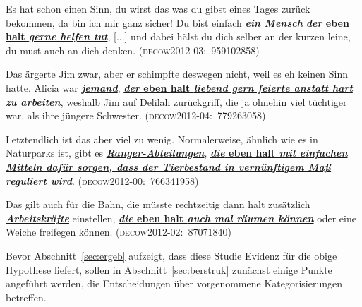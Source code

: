 \begin{exe}
	\ex\label{750} 
		\begin{xlist}	
		\ex\label{750a} 
	
		Es hat schon einen Sinn, du wirst das was du gibst eines Tages zurück bekommen, da bin ich
	 	mir ganz sicher! Du bist einfach \ul{\textbf{\textit{ein Mensch}}} \ul{\textbf{\textit{der} eben halt \textit{gerne helfen tut}}}, [...] und dabei hälst du dich selber an der kurzen leine, du must auch an dich denken.	
	 	\newline\hbox{}\hfill\hbox{\scshape(decow2012-03: 959102858)}
	 	\newline
	 	\hbox{}\hfill\hbox{\citet[168]{Mueller2016a}}
	 	\ex\label{750b} 
	 
	 	Das ärgerte Jim zwar, aber er schimpfte deswegen nicht, weil es eh keinen Sinn hatte. Alicia war \ul{\textit{\textbf{jemand}}}, \ul{\textbf{\textit{der} eben halt \textit{liebend gern feierte anstatt hart zu arbeiten}}}, weshalb Jim auf Delilah zurückgriff, die ja ohnehin viel tüchtiger war, als ihre jüngere Schwester.
		\newline		
	 	\hbox{}\hfill\hbox{\scshape(decow2012-04: 779263058)}
		\end{xlist}
\end{exe}

\begin{exe}
	\ex\label{751} 
		\begin{xlist}	
		\ex\label{751a} 
	
		Letztendlich ist das aber viel zu wenig. Normalerweise, ähnlich wie es in Naturparks ist, gibt es \ul{\textbf{\textit{Ranger-Abteilungen}}}, \ul{\textbf{\textit{die} eben halt \textit{mit einfachen Mitteln dafür sorgen, dass der Tierbestand in vernünftigem Maß reguliert wird}}}. 
	 	\hfill\hbox{\scshape(decow2012-00: 766341958)}
	 	\newline
	 	\hbox{}\hfill\hbox{\citet[168]{Mueller2016a}}
	 	\ex\label{751b} 
	 
	 	Das gilt auch für die Bahn, die müsste rechtzeitig dann halt zusätzlich \ul{\textbf{\textit{Arbeitskräfte}}} einstellen, \ul{\textbf{\textit{die} eben halt \textit{auch mal räumen können}}} oder eine Weiche freifegen können.
	 	\hbox{}\hfill\hbox{\scshape(decow2012-02: 87071840)}
		\end{xlist}
\end{exe} 
Bevor Abschnitt~\ref{sec:ergeb} aufzeigt, dass diese Studie Evidenz für die obige Hypothese liefert, sollen in Abschnitt~\ref{sec:berstruk} zunächst einige Punkte angeführt werden, die Entscheidungen über vorgenommene Kategorisierungen betreffen.

